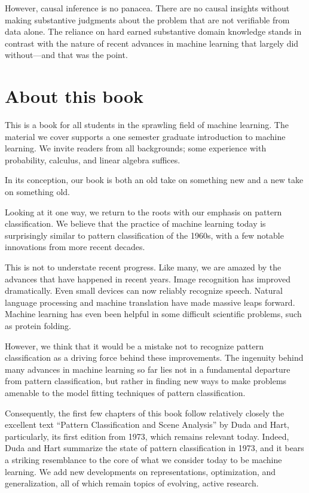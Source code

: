\documentclass{tufte-book}
\begin{document}
However, causal inference is no panacea. There are no causal insights
without making substantive judgments about the problem that are not
verifiable from data alone. The reliance on hard earned substantive
domain knowledge stands in contrast with the nature of recent advances
in machine learning that largely did without---and that was the point.

\hypertarget{about-this-book}{%
\section{About this book}\label{about-this-book}}

This is a book for all students in the sprawling field of machine
learning. The material we cover supports a one semester graduate
introduction to machine learning. We invite readers from all
backgrounds; some experience with probability, calculus, and linear
algebra suffices.

In its conception, our book is both an old take on something new and a
new take on something old.

Looking at it one way, we return to the roots with our emphasis on
pattern classification. We believe that the practice of machine learning
today is surprisingly similar to pattern classification of the 1960s,
with a few notable innovations from more recent decades.

This is not to understate recent progress. Like many, we are amazed by
the advances that have happened in recent years. Image recognition has
improved dramatically. Even small devices can now reliably recognize
speech. Natural language processing and machine translation have made
massive leaps forward. Machine learning has even been helpful in some
difficult scientific problems, such as protein folding.

However, we think that it would be a mistake not to recognize pattern
classification as a driving force behind these improvements. The
ingenuity behind many advances in machine learning so far lies not in a
fundamental departure from pattern classification, but rather in finding
new ways to make problems amenable to the model fitting techniques of
pattern classification.

Consequently, the first few chapters of this book follow relatively
closely the excellent text ``Pattern Classification and Scene Analysis''
by Duda and Hart, particularly, its first edition from 1973, which
remains relevant today. Indeed, Duda and Hart summarize the state of
pattern classification in 1973, and it bears a striking resemblance to
the core of what we consider today to be machine learning. We add new
developments on representations, optimization, and generalization, all
of which remain topics of evolving, active research.
\end{document}

